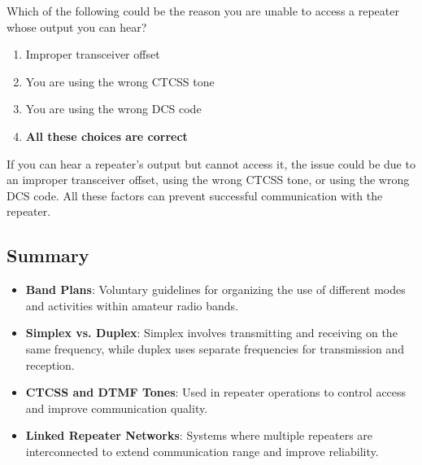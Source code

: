 \begin{tcolorbox}[colback=gray!10!white,colframe=black!75!black,title={T2B04}]
    Which of the following could be the reason you are unable to access a repeater whose output you can hear?
    \begin{enumerate}[label=\Alph*),noitemsep]
        \item Improper transceiver offset
        \item You are using the wrong CTCSS tone
        \item You are using the wrong DCS code
        \item \textbf{All these choices are correct}
    \end{enumerate}
\end{tcolorbox}
If you can hear a repeater's output but cannot access it, the issue could be due to an improper transceiver offset, using the wrong CTCSS tone, or using the wrong DCS code. All these factors can prevent successful communication with the repeater.


\subsection*{Summary}
\begin{itemize}
    \item \textbf{Band Plans}: Voluntary guidelines for organizing the use of different modes and activities within amateur radio bands.
    \item \textbf{Simplex vs. Duplex}: Simplex involves transmitting and receiving on the same frequency, while duplex uses separate frequencies for transmission and reception.
    \item \textbf{CTCSS and DTMF Tones}: Used in repeater operations to control access and improve communication quality.
    \item \textbf{Linked Repeater Networks}: Systems where multiple repeaters are interconnected to extend communication range and improve reliability.
\end{itemize}
